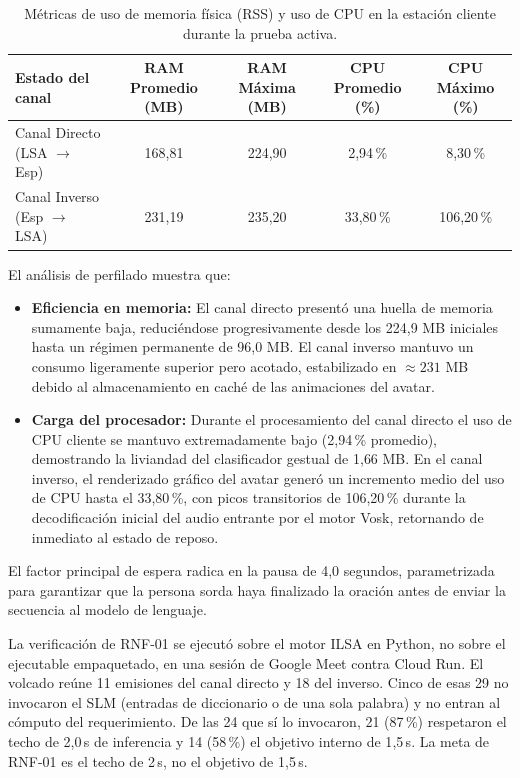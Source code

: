 \begin{table}[H]
    \centering
    \small
    \caption{Métricas de uso de memoria física (RSS) y uso de CPU en la estación cliente durante la prueba activa.}
    \label{tab:perfilado_recursos_log}
    \begin{tabular}{lcccc}
        \toprule
        \textbf{Estado del canal} & \textbf{RAM Promedio (MB)} & \textbf{RAM Máxima (MB)} & \textbf{CPU Promedio (\%)} & \textbf{CPU Máximo (\%)} \\
        \midrule
        Canal Directo (LSA $\rightarrow$ Esp) & 168{,}81 & 224{,}90 & 2{,}94\,\% & 8{,}30\,\% \\
        Canal Inverso (Esp $\rightarrow$ LSA) & 231{,}19 & 235{,}20 & 33{,}80\,\% & 106{,}20\,\% \\
        \bottomrule
    \end{tabular}
\end{table}

El análisis de perfilado muestra que:
\begin{itemize}
    \item \textbf{Eficiencia en memoria:} El canal directo presentó una huella de memoria sumamente baja, reduciéndose progresivamente desde los 224{,}9 MB iniciales hasta un régimen permanente de 96{,}0 MB. El canal inverso mantuvo un consumo ligeramente superior pero acotado, estabilizado en $\approx 231$ MB debido al almacenamiento en caché de las animaciones del avatar.
    \item \textbf{Carga del procesador:} Durante el procesamiento del canal directo el uso de CPU cliente se mantuvo extremadamente bajo (2{,}94\,\% promedio), demostrando la liviandad del clasificador gestual de 1{,}66 MB. En el canal inverso, el renderizado gráfico del avatar generó un incremento medio del uso de CPU hasta el 33{,}80\,\%, con picos transitorios de 106{,}20\,\% durante la decodificación inicial del audio entrante por el motor Vosk, retornando de inmediato al estado de reposo.
\end{itemize}
El factor principal de espera radica en la pausa de 4,0 segundos, parametrizada para garantizar que la persona sorda haya finalizado la oración antes de enviar la secuencia al modelo de lenguaje.

La verificación de RNF-01 se ejecutó sobre el motor ILSA en Python, no sobre el ejecutable empaquetado, en una sesión de Google Meet contra Cloud Run. El volcado reúne 11 emisiones del canal directo y 18 del inverso. Cinco de esas 29 no invocaron el SLM (entradas de diccionario o de una sola palabra) y no entran al cómputo del requerimiento. De las 24 que sí lo invocaron, 21 (87\,\%) respetaron el techo de 2{,}0\,s de inferencia y 14 (58\,\%) el objetivo interno de 1{,}5\,s. La meta de RNF-01 es el techo de 2\,s, no el objetivo de 1{,}5\,s.

